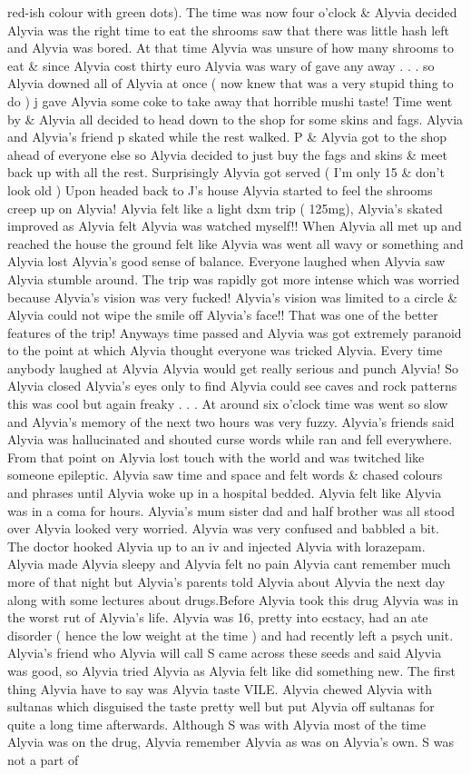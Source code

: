 \documentclass[12pt]{book}
\begin{document}
red-ish colour with green dots). The time was now four o'clock \& Alyvia decided Alyvia was the right time to eat the shrooms saw that there was little hash left and Alyvia was bored. At that time Alyvia was unsure of how many shrooms to eat \& since Alyvia cost thirty euro Alyvia was wary of gave any away . . .  so Alyvia downed all of Alyvia at once ( now knew that was a very stupid thing to do ) j gave Alyvia some coke to take away that horrible mushi taste! Time went by \& Alyvia all decided to head down to the shop for some skins and fags. Alyvia and Alyvia's friend p skated while the rest walked. P \& Alyvia got to the shop ahead of everyone else so Alyvia decided to just buy the fags and skins \& meet back up with all the rest. Surprisingly Alyvia got served ( I'm only 15 \& don't look old ) Upon headed back to J's house Alyvia started to feel the shrooms creep up on Alyvia! Alyvia felt like a light dxm trip ( 125mg), Alyvia's skated improved as Alyvia felt Alyvia was watched myself!! When Alyvia all met up and reached the house the ground felt like Alyvia was went all wavy or something and Alyvia lost Alyvia's good sense of balance. Everyone laughed when Alyvia saw Alyvia stumble around. The trip was rapidly got more intense which was worried because Alyvia's vision was very fucked! Alyvia's vision was limited to a circle \& Alyvia could not wipe the smile off Alyvia's face!! That was one of the better features of the trip! Anyways time passed and Alyvia was got extremely paranoid to the point at which Alyvia thought everyone was tricked Alyvia. Every time anybody laughed at Alyvia Alyvia would get really serious and punch Alyvia! So Alyvia closed Alyvia's eyes only to find Alyvia could see caves and rock patterns this was cool but again freaky  . . .  At around six o'clock time was went so slow and Alyvia's memory of the next two hours was very fuzzy. Alyvia's friends said Alyvia was hallucinated and shouted curse words while ran and fell everywhere. From that point on Alyvia lost touch with the world and was twitched like someone epileptic. Alyvia saw time and space and felt words \& chased colours and phrases until Alyvia woke up in a hospital bedded. Alyvia felt like Alyvia was in a coma for hours. Alyvia's mum sister dad and half brother was all stood over Alyvia looked very worried. Alyvia was very confused and babbled a bit. The doctor hooked Alyvia up to an iv and injected Alyvia with lorazepam. Alyvia made Alyvia sleepy and Alyvia felt no pain Alyvia cant remember much more of that night but Alyvia's parents told Alyvia about Alyvia the next day along with some lectures about drugs.Before Alyvia took this drug Alyvia was in the worst rut of Alyvia's life. Alyvia was 16, pretty into ecstacy, had an ate disorder ( hence the low weight at the time ) and had recently left a psych unit. Alyvia's friend who Alyvia will call S came across these seeds and said Alyvia was good, so Alyvia tried Alyvia as Alyvia felt like did something new. The first thing Alyvia have to say was Alyvia taste VILE. Alyvia chewed Alyvia with sultanas which disguised the taste pretty well but put Alyvia off sultanas for quite a long time afterwards. Although S was with Alyvia most of the time Alyvia was on the drug, Alyvia remember Alyvia as was on Alyvia's own. S was not a part of 
\end{document}
